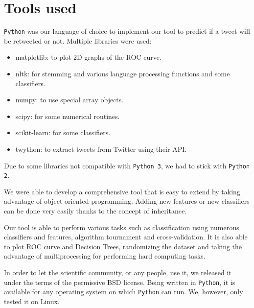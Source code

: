 \section{Tools used}

\verb|Python| was our language of choice to implement our tool to predict if a 
tweet will be retweeted or not. Multiple libraries were used:
\begin{itemize}
	\item matplotlib: to plot 2D graphs of the ROC curve.
	\item nltk: for stemming and various language processing functions and some 
		  classifiers.
	\item numpy: to use special array objects.
	\item scipy: for some numerical routines.
	\item scikit-learn: for some classifiers.
	\item twython: to extract tweets from Twitter using their API.
\end{itemize}

Due to some libraries not compatible with \verb|Python 3|, we had to stick with 
\verb|Python 2|.

We were able to develop a comprehensive tool that is easy to extend by taking 
advantage of object oriented programming. Adding new features or new 
classifiers can be done very easily thanks to the concept of inheritance.

Our tool is able to perform various tasks such as classification using numerous 
classifiers and features, algorithm tournament and cross-validation. It is also 
able to plot ROC curve and Decision Trees, randomizing the dataset and taking 
the advantage of multiprocessing for performing hard computing tasks.

In order to let the scientific community, or any people, use it, we released it 
under the terms of the permissive BSD license. Being written in \verb|Python|, 
it is available for any operating system on which \verb|Python| can run. We, 
however, only tested it on Linux.
